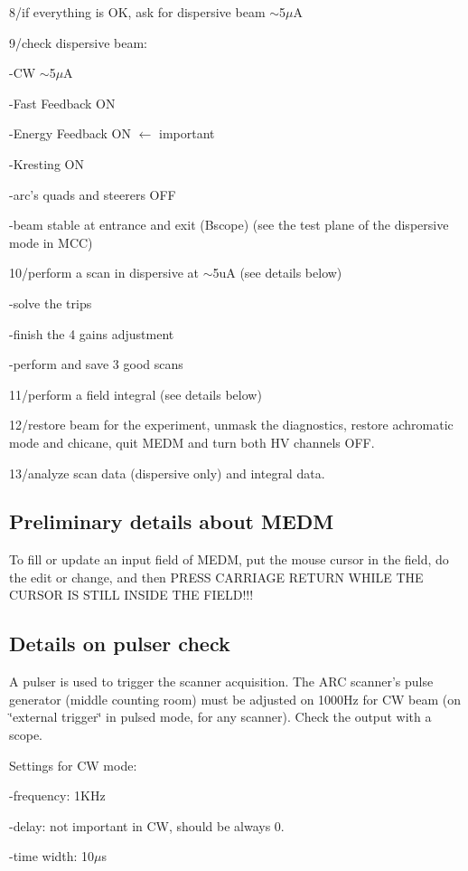 8/if everything is OK, ask for dispersive beam \( \sim  \)5$\mu$A 

9/check dispersive beam: 

-CW \( \sim  \)5$\mu$A 

-Fast Feedback ON 

-Energy Feedback ON $\leftarrow$ important 

-Kresting ON 

-arc's quads and steerers OFF 

-beam stable at entrance and exit (Bscope) (see the test plane of the dispersive
mode in MCC) 

10/perform a scan in dispersive at \( \sim  \)5uA (see details below) 

-solve the trips 

-finish the 4 gains adjustment 

-perform and save 3 good scans 

11/perform a field integral (see details below) 

12/restore beam for the experiment, unmask the diagnostics, restore achromatic
mode and chicane, quit MEDM and turn both HV channels OFF. 

13/analyze scan data (dispersive only) and integral data. 


\subsection{Preliminary details about MEDM }

To fill or update an input field of MEDM, put the mouse cursor in the field,
do the edit or change, and then PRESS CARRIAGE RETURN WHILE THE CURSOR IS STILL
INSIDE THE FIELD!!! 


\subsection{Details on pulser check }

A pulser is used to trigger the scanner acquisition. The ARC scanner's pulse generator
(middle counting room) must be adjusted on 1000Hz for CW beam (on \char`\"{}external
trigger\char`\"{} in pulsed mode, for any scanner). Check the output with a
scope. 

Settings for CW mode:

-frequency: 1KHz 

-delay: not important in CW, should be always 0. 

-time width: 10$\mu$s 


